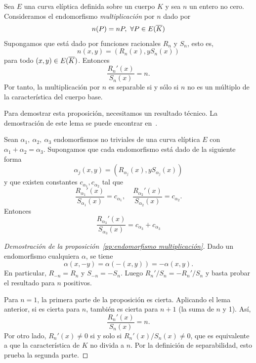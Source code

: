 \begin{proposicion}\label{pp:endomorfismo multiplicación}
	Sea $E$ una curva elíptica definida sobre un cuerpo $K$ y sea $n$ un entero no cero. Consideramos el endomorfismo \emph{multiplicación} por $n$  dado por
	$$
		n(P) = n P,\ \forall P \in E(\overline{K})
	$$
	Supongamos que está dado por funciones racionales $R_n$ y $S_n$, esto es,
	$$
		n(x, y) = (R_n(x), y S_n(x))
	$$
	para todo $(x, y) \in E(\overline{K})$. Entonces
	$$
		\frac{R_n'(x)}{S_n(x)} = n.
	$$
	Por tanto, la multiplicación por $n$ es separable si y sólo si $n$ no es un múltiplo de la característica del cuerpo base.
\end{proposicion}

Para demostrar esta proposición, necesitamos un resultado técnico. La demostración de este lema se puede encontrar en~\cite[sec 2.9]{Washington:2008}.

\begin{lema}
	Sean $\alpha_1,\ \alpha_2,\ \alpha_3$ endomorfismos no triviales de una curva elíptica $E$ con $\alpha_1 + \alpha_2 = \alpha_3$. Supongamos que cada endomorfismo está dado de la siguiente forma
	$$
		\alpha_j(x, y) = (R_{\alpha_j}(x), y S_{\alpha_j}(x))
	$$
	y que existen constantes $c_{\alpha_1}, c_{\alpha_2}$ tal que
	$$
		\frac{R_{\alpha_1}'(x)}{S_{\alpha_1}(x)} = c_{\alpha_1}, \quad  \frac{R_{\alpha_2}'(x)}{S_{\alpha_2}(x)} = c_{\alpha_2}.
	$$
	Entonces
	$$
		\frac{R_{\alpha_3}'(x)}{S_{\alpha_3}(x)} = c_{\alpha_3} + c_{\alpha_3}
	$$
\end{lema}

\begin{proof}[Demostración de la proposición~\ref{pp:endomorfismo multiplicación}]
Dado un endomorfismo cualquiera $\alpha$, se tiene
$$
	\alpha(x, -y) = \alpha(-(x, y)) = - \alpha(x, y).
$$
En particular, $R_{-n} = R_n$ y $S_{-n} = -S_n$. Luego $R_n' / S_n = - R_n' / S_n$ y basta probar el resultado para $n$ positivos.

Para $n = 1$, la primera parte de la proposición es cierta. Aplicando el lema anterior, si es cierta para $n$, también es cierta para $n +1$ (la suma de $n$ y 1). Así,
$$
	\frac{R_n'(x)}{S_n(x)} = n.
$$
Por otro lado, $R_n'(x) \neq 0$ si y solo si $R_n'(x) / S_n(x) \neq 0$, que es equivalente a que la característica de $K$ no divida a $n$. Por la definición de separabilidad, esto prueba la segunda parte.
\end{proof}


